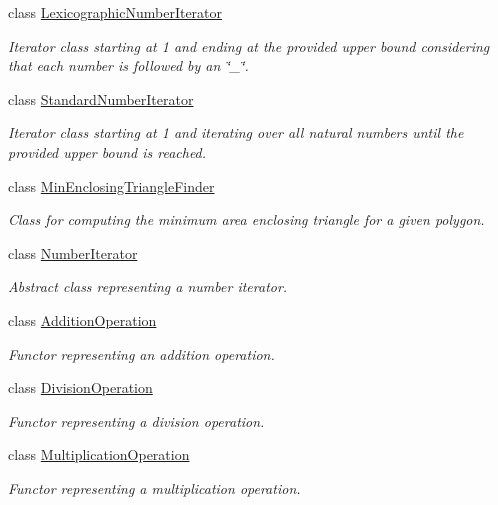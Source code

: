 \begin{DoxyCompactItemize}
class \hyperlink{classmultiscale_1_1LexicographicNumberIterator}{Lexicographic\-Number\-Iterator}
\begin{DoxyCompactList}\small\item\em Iterator class starting at 1 and ending at the provided upper bound considering that each number is followed by an \char`\"{}\-\_\-\char`\"{}. \end{DoxyCompactList}\item 
class \hyperlink{classmultiscale_1_1StandardNumberIterator}{Standard\-Number\-Iterator}
\begin{DoxyCompactList}\small\item\em Iterator class starting at 1 and iterating over all natural numbers until the provided upper bound is reached. \end{DoxyCompactList}\item 
class \hyperlink{classmultiscale_1_1MinEnclosingTriangleFinder}{Min\-Enclosing\-Triangle\-Finder}
\begin{DoxyCompactList}\small\item\em Class for computing the minimum area enclosing triangle for a given polygon. \end{DoxyCompactList}\item 
class \hyperlink{classmultiscale_1_1NumberIterator}{Number\-Iterator}
\begin{DoxyCompactList}\small\item\em Abstract class representing a number iterator. \end{DoxyCompactList}\item 
class \hyperlink{classmultiscale_1_1AdditionOperation}{Addition\-Operation}
\begin{DoxyCompactList}\small\item\em Functor representing an addition operation. \end{DoxyCompactList}\item 
class \hyperlink{classmultiscale_1_1DivisionOperation}{Division\-Operation}
\begin{DoxyCompactList}\small\item\em Functor representing a division operation. \end{DoxyCompactList}\item 
class \hyperlink{classmultiscale_1_1MultiplicationOperation}{Multiplication\-Operation}
\begin{DoxyCompactList}\small\item\em Functor representing a multiplication operation. \end{DoxyCompactList}\item 

\end{DoxyCompactItemize}
